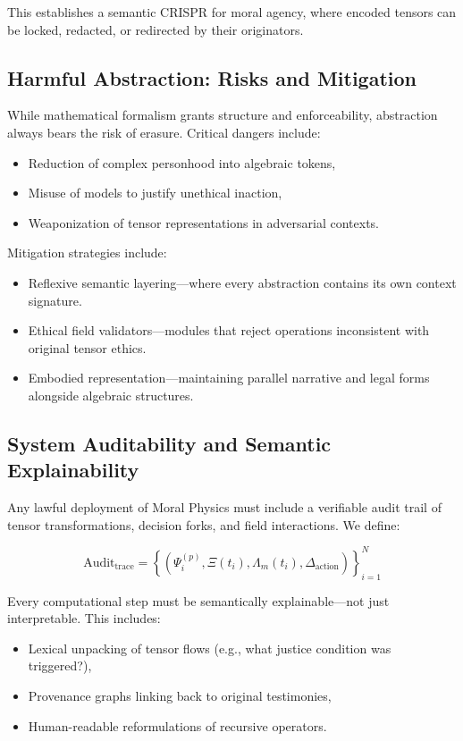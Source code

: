 \documentclass[12]{amsart}
\theoremstyle{plain}
\begin{document}
This establishes a semantic CRISPR for moral agency, where encoded tensors can be locked, redacted, or redirected by their originators.

\subsection{Harmful Abstraction: Risks and Mitigation}

While mathematical formalism grants structure and enforceability, abstraction always bears the risk of erasure. Critical dangers include:

\begin{itemize}
    \item Reduction of complex personhood into algebraic tokens,
    \item Misuse of models to justify unethical inaction,
    \item Weaponization of tensor representations in adversarial contexts.
\end{itemize}

Mitigation strategies include:

\begin{itemize}
    \item Reflexive semantic layering—where every abstraction contains its own context signature.
    \item Ethical field validators—modules that reject operations inconsistent with original tensor ethics.
    \item Embodied representation—maintaining parallel narrative and legal forms alongside algebraic structures.
\end{itemize}

\subsection{System Auditability and Semantic Explainability}

Any lawful deployment of Moral Physics must include a verifiable audit trail of tensor transformations, decision forks, and field interactions. We define:

\[
\text{Audit}_{\text{trace}} = \left\{ \left( \Psi^{(p)}_i, \Xi(t_i), \Lambda_m(t_i), \Delta_{\text{action}} \right) \right\}_{i=1}^N
\]

Every computational step must be semantically explainable—not just interpretable. This includes:

\begin{itemize}
    \item Lexical unpacking of tensor flows (e.g., what justice condition was triggered?),
    \item Provenance graphs linking back to original testimonies,
    \item Human-readable reformulations of recursive operators.
\end{itemize}
\end{document}
